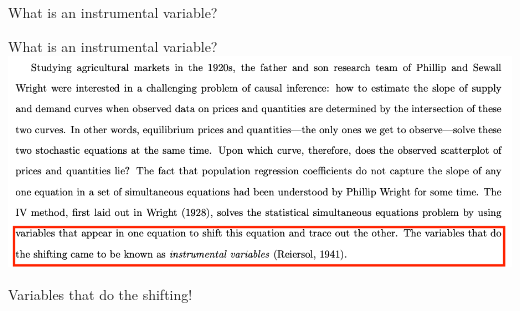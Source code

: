 \documentclass[notes,11pt, aspectratio=169]{beamer}
\newenvironment{wideitemize}{\itemize\addtolength{\itemsep}{10pt}}{\enditemize}
\begin{document}
\begin{frame}{What is an instrumental variable?}
\end{frame}

\begin{frame}{What is an instrumental variable?}
  \includegraphics[width=\linewidth]{images/mheiva.png}
\begin{wideitemize}
  \item Variables that do the shifting!
\end{wideitemize}
\end{frame}
\end{document}
